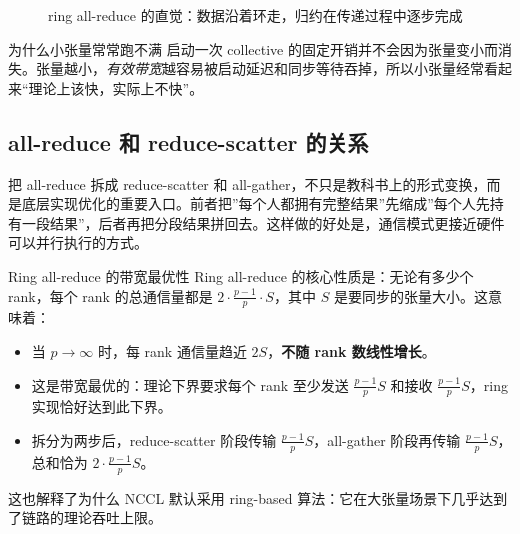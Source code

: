 \documentclass[a4paper]{article}
\begin{document}
\begin{figure}[H]
\centering
{}
\caption{ring all-reduce 的直觉：数据沿着环走，归约在传递过程中逐步完成}
\end{figure}

\begin{warningbox}{为什么小张量常常跑不满}
启动一次 collective 的固定开销并不会因为张量变小而消失。张量越小，\emph{有效带宽}越容易被启动延迟和同步等待吞掉，所以小张量经常看起来“理论上该快，实际上不快”。
\end{warningbox}

\subsection{all-reduce 和 reduce-scatter 的关系}

把 all-reduce 拆成 reduce-scatter 和 all-gather，不只是教科书上的形式变换，而是底层实现优化的重要入口。前者把”每个人都拥有完整结果”先缩成”每个人先持有一段结果”，后者再把分段结果拼回去。这样做的好处是，通信模式更接近硬件可以并行执行的方式。

\begin{importantbox}{Ring all-reduce 的带宽最优性}
Ring all-reduce 的核心性质是：无论有多少个 rank，每个 rank 的总通信量都是 $2 \cdot \frac{p-1}{p} \cdot S$，其中 $S$ 是要同步的张量大小。这意味着：
\begin{itemize}
    \item 当 $p \to \infty$ 时，每 rank 通信量趋近 $2S$，\textbf{不随 rank 数线性增长}。
    \item 这是带宽最优的：理论下界要求每个 rank 至少发送 $\frac{p-1}{p} S$ 和接收 $\frac{p-1}{p} S$，ring 实现恰好达到此下界。
    \item 拆分为两步后，reduce-scatter 阶段传输 $\frac{p-1}{p} S$，all-gather 阶段再传输 $\frac{p-1}{p} S$，总和恰为 $2 \cdot \frac{p-1}{p} S$。
\end{itemize}
这也解释了为什么 NCCL 默认采用 ring-based 算法：它在大张量场景下几乎达到了链路的理论吞吐上限。
\end{importantbox}
\end{document}
